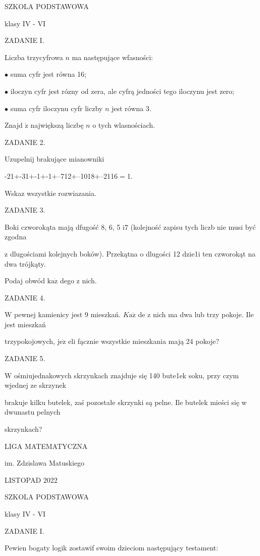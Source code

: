 \documentclass[a4paper,12pt]{article}
\begin{document}
SZKOLA PODSTAWOWA

klasy IV - VI

ZADANIE I.

Liczba trzycyfrowa $n$ ma następujące wfasności:

$\bullet$ suma cyfr jest równa 16;

$\bullet$ iloczyn cyfr jest rózny od zera, ale cyfrą jedności tego iloczynu jest zero;

$\bullet$ suma cyfr iloczynu cyfr liczby $n$ jest równa 3.

Znajd $\acute{\mathrm{z}}$ największą liczbę $n$ o tych wlasnościach.

ZADANIE 2.

Uzupelnij brakujące mianowniki

-21$+$-31$+$-1$+$-1$+$--712$+$--1018$+$--2116$=$1.

Wskaz wszystkie rozwiazania.

ZADANIE 3.

Boki czworokąta mają dfugość 8, 6, 5 $\mathrm{i} 7$ (kolejność zapisu tych liczb nie musi być zgodna

z dlugościami kolejnych boków). Przekątna o dlugości 12 dzie1i ten czworokąt na dwa trójkąty.

Podaj obwód $\mathrm{k}\mathrm{a}\dot{\mathrm{z}}$ dego z nich.

ZADANIE 4.

$\mathrm{W}$ pewnej kamienicy jest 9 mieszkań. $K\mathrm{a}\dot{\mathrm{z}}$ de z nich ma dwa lub trzy pokoje. Ile jest mieszkań

trzypokojowych, $\mathrm{j}\mathrm{e}\dot{\mathrm{z}}$ eli fącznie wszystkie mieszkania mają 24 pokoje?

ZADANIE 5.

$\mathrm{W}$ ośmiujednakowych skrzynkach znajduje się 140 bute1ek soku, przy czym wjednej ze skrzynek

brakuje kilku butelek, zaś pozostałe skrzynki są pelne. Ile butelek mieści się w dwunastu pelnych

skrzynkach?






LIGA MATEMATYCZNA

im. Zdzislawa Matuskiego

LISTOPAD 2022

SZKOLA PODSTAWOWA

klasy IV - VI

ZADANIE I.

Pewien bogaty logik zostawif swoim dzieciom następujący testament:
\end{document}
